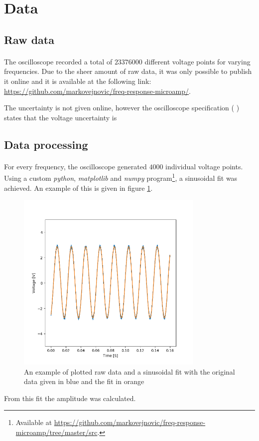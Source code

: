 \documentclass[a4paper, 12pt]{article}
\begin{document}
\section{Data}

\subsection{Raw data}
\paragraph*{}
The oscilloscope recorded a total of $23376000$ different voltage points for 
varying frequencies. Due to the sheer amount of raw data, it was only possible 
to publish it online and it is available at the following link:
\url{https://github.com/markovejnovic/freq-response-microamp/}.

The uncertainty is not given online, however the oscilloscope specification 
(%
) states that the voltage uncertainty is %

\subsection{Data processing}
\paragraph*{}
For every frequency, the oscilloscope generated $4000$ individual voltage 
points. Using a custom \textit{python}, \textit{matplotlib} and \textit{numpy} 
program\footnote{
Available at
\url{https://github.com/markovejnovic/freq-response-microamp/tree/master/src}.
}, a sinusoidal fit was achieved. An example of this is given in figure 
\ref{fig:process1-example}.
\begin{figure}[ht]
	\centering
	\includegraphics[width=0.8\textwidth]{img/process1-example}
	\caption{An example of plotted raw data and a sinusoidal fit with the 
	original data given in blue and the fit in orange}
	\label{fig:process1-example}
\end{figure}
From this fit the amplitude was calculated. 
\end{document}
